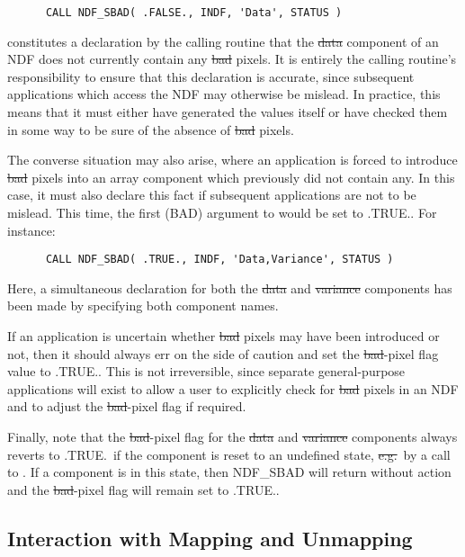 \small
\begin{verbatim}
      CALL NDF_SBAD( .FALSE., INDF, 'Data', STATUS )
\end{verbatim}
\normalsize

constitutes a declaration by the calling routine that the \st{data\/} component
of an NDF does not currently contain any \st{bad\/} pixels. 
It is entirely the calling routine's responsibility to ensure that this
declaration is accurate, since subsequent applications which access the NDF may
otherwise be mislead. 
In practice, this means that it must either have generated the values itself
or have checked them in some way to be sure of the absence of \st{bad\/}
pixels. 

The converse situation may also arise, where an application is forced to 
introduce \st{bad\/} pixels into an array component which previously did not 
contain any.
In this case, it must also declare this fact if subsequent applications are not
to be mislead. 
This time, the first (BAD) argument to  would be set to .TRUE..
For instance:

\small
\begin{verbatim}
      CALL NDF_SBAD( .TRUE., INDF, 'Data,Variance', STATUS )
\end{verbatim}
\normalsize

Here, a simultaneous declaration for both the \st{data\/} and \st{variance\/}
components has been made by specifying both component names.

If an application is uncertain whether \st{bad\/} pixels may have been
introduced or not, then it should always err on the side of caution and set the
\st{bad\/}-pixel flag value to .TRUE.. 
This is not irreversible, since separate general-purpose applications will
exist to allow a user to explicitly check for \st{bad\/} pixels in an NDF and
to adjust the \st{bad\/}-pixel flag if required. 

Finally, note that the \st{bad\/}-pixel flag for the \st{data\/} and
\st{variance\/} components always reverts to .TRUE.\ if the component
is reset to 
an undefined state, \st{e.g.}\ by a call to . 
If a component is in this state, then NDF\_SBAD will return without action
and the \st{bad\/}-pixel flag will remain set to .TRUE.. 

\subsection{\label{ss:mappinginteract}Interaction with Mapping and Unmapping}

